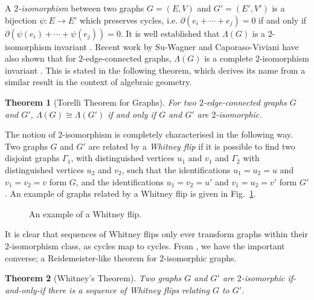 \documentclass[12pt]{report}
\newtheorem*{theorem}{Theorem}
\begin{document}
A \textit{$2$-isomorphism} between two graphs $G = (E, V)$ and $G' = (E', V')$ is a bijection \({\psi: E \longrightarrow E'}\) which preserves cycles, i.e. $\partial(e_{i} + \cdots + e_{j}) = 0$ if and only if $\partial\left(\psi(e_{i}) + \cdots + \psi(e_{j})\right) = 0$. It is well established that $\Lambda(G)$ is a $2$-isomorphism invariant \parencite{lattice-of-flows-cuts}. Recent work by Su-Wagner and Caporaso-Viviani have also shown that for $2$-edge-connected graphs, $\Lambda(G)$ is a complete $2$-isomorphism invariant \cites[Theorem 3.1.1]{torelli-for-graphs-tropical-curves}[Theorem 1]{lattice-of-flows-regular-matroid}. This is stated in the following theorem, which derives its name from a similar result in the context of algebraic geometry.


\begin{theorem}[Torelli Theorem for Graphs]
For two $2$-edge-connected graphs $G$ and $G'$, $\Lambda(G) \cong \Lambda(G')$ if and only if $G$ and $G'$ are $2$-isomorphic.
\end{theorem}

The notion of $2$-isomorphism is completely characterised in the following way. Two graphs $G$ and $G'$ are related by a \textit{Whitney flip} if it is possible to find two disjoint graphs $\Gamma_{1}$, with distinguished vertices $u_{1}$ and $v_{1}$ and $\Gamma_{2}$ with distinguished vertices $u_{2}$ and $v_{2}$, such that the identifications $u_{1} = u_{2} = u$ and $v_{1} = v_{2} = v$ form $G$, and the identifications $u_{1} = v_{2} = u'$ and $v_{1} = u_{2} = v'$ form $G'$. An example of graphs related by a Whitney flip is given in Fig.~\ref{fig:whitney_flip}.

\begin{figure}[hbt!]
	\centering
	\def\svgscale{0.5}
	
	
	\caption{An example of a Whitney flip.}
	\label{fig:whitney_flip}
\end{figure}

It is clear that sequences of Whitney flips only ever transform graphs within their $2$-isomorphism class, as cycles map to cycles. From \cite{2-isomorphic-graphs}, we have the important converse; a Reidemeister-like theorem for $2$-isomorphic graphs.

\begin{theorem}[Whitney's Theorem]
Two graphs $G$ and $G'$ are $2$-isomorphic if-and-only-if there is a sequence of Whitney flips relating $G$ to $G'$.
\end{theorem}
\end{document}
